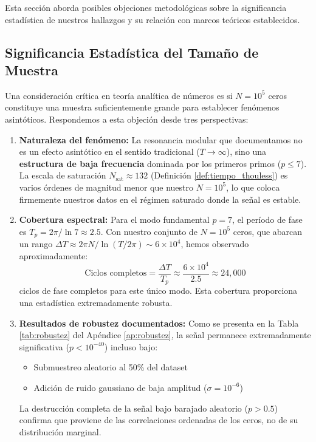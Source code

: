 \documentclass[12pt, a4paper]{article}
\theoremstyle{plain}
\theoremstyle{definition}
\theoremstyle{remark}
\begin{document}
Esta sección aborda posibles objeciones metodológicas sobre la significancia estadística de nuestros hallazgos y su relación con marcos teóricos establecidos.

\subsection{Significancia Estadística del Tamaño de Muestra}
\label{subsec:significancia_muestra}

Una consideración crítica en teoría analítica de números es si $N=10^5$ ceros constituye una muestra suficientemente grande para establecer fenómenos asintóticos. Respondemos a esta objeción desde tres perspectivas:

\begin{enumerate}
    \item \textbf{Naturaleza del fenómeno:} La resonancia modular que documentamos no es un efecto asintótico en el sentido tradicional ($T \to \infty$), sino una \textbf{estructura de baja frecuencia} dominada por los primeros primos ($p \leq 7$). La escala de saturación $N_{\text{sat}} \approx 132$ (Definición \ref{def:tiempo_thouless}) es varios órdenes de magnitud menor que nuestro $N=10^5$, lo que coloca firmemente nuestros datos en el régimen saturado donde la señal es estable.
    
    \item \textbf{Cobertura espectral:} Para el modo fundamental $p=7$, el período de fase es $T_p = 2\pi/\ln 7 \approx 2.5$. Con nuestro conjunto de $N=10^5$ ceros, que abarcan un rango $\Delta T \approx 2\pi N/\ln(T/2\pi) \sim 6\times10^4$, hemos observado aproximadamente:
    \[
    \text{Ciclos completos} = \frac{\Delta T}{T_p} \approx \frac{6\times10^4}{2.5} \approx 24,000
    \]
    ciclos de fase completos para este único modo. Esta cobertura proporciona una estadística extremadamente robusta.
    
    \item \textbf{Resultados de robustez documentados:} Como se presenta en la Tabla \ref{tab:robustez} del Apéndice \ref{ap:robustez}, la señal permanece extremadamente significativa ($p < 10^{-40}$) incluso bajo:
    \begin{itemize}
        \item Submuestreo aleatorio al 50\% del dataset
        \item Adición de ruido gaussiano de baja amplitud ($\sigma = 10^{-6}$)
    \end{itemize}
    La destrucción completa de la señal bajo barajado aleatorio ($p > 0.5$) confirma que proviene de las correlaciones ordenadas de los ceros, no de su distribución marginal.
\end{enumerate}
\end{document}
